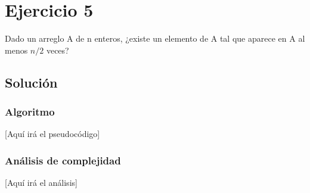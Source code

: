 \section{Ejercicio 5}
Dado un arreglo A de n enteros, ¿existe un elemento de A tal que aparece en A al menos $n/2$ veces?

\subsection*{Solución}
\subsubsection*{Algoritmo}
[Aquí irá el pseudocódigo]

\subsubsection*{Análisis de complejidad}
[Aquí irá el análisis] 